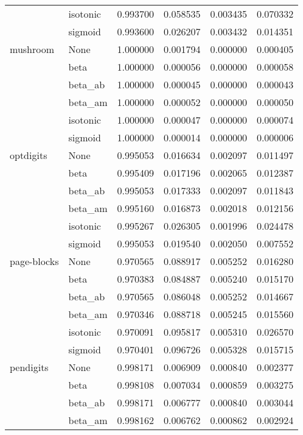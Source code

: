 \begin{tabular}{llrrrr}
        & isotonic &  0.993700 &  0.058535 &  0.003435 &  0.070332 \\
        & sigmoid &  0.993600 &  0.026207 &  0.003432 &  0.014351 \\
mushroom & None &  1.000000 &  0.001794 &  0.000000 &  0.000405 \\
        & beta &  1.000000 &  0.000056 &  0.000000 &  0.000058 \\
        & beta\_ab &  1.000000 &  0.000045 &  0.000000 &  0.000043 \\
        & beta\_am &  1.000000 &  0.000052 &  0.000000 &  0.000050 \\
        & isotonic &  1.000000 &  0.000047 &  0.000000 &  0.000074 \\
        & sigmoid &  1.000000 &  0.000014 &  0.000000 &  0.000006 \\
optdigits & None &  0.995053 &  0.016634 &  0.002097 &  0.011497 \\
        & beta &  0.995409 &  0.017196 &  0.002065 &  0.012387 \\
        & beta\_ab &  0.995053 &  0.017333 &  0.002097 &  0.011843 \\
        & beta\_am &  0.995160 &  0.016873 &  0.002018 &  0.012156 \\
        & isotonic &  0.995267 &  0.026305 &  0.001996 &  0.024478 \\
        & sigmoid &  0.995053 &  0.019540 &  0.002050 &  0.007552 \\
page-blocks & None &  0.970565 &  0.088917 &  0.005252 &  0.016280 \\
        & beta &  0.970383 &  0.084887 &  0.005240 &  0.015170 \\
        & beta\_ab &  0.970565 &  0.086048 &  0.005252 &  0.014667 \\
        & beta\_am &  0.970346 &  0.088718 &  0.005245 &  0.015560 \\
        & isotonic &  0.970091 &  0.095817 &  0.005310 &  0.026570 \\
        & sigmoid &  0.970401 &  0.096726 &  0.005328 &  0.015715 \\
pendigits & None &  0.998171 &  0.006909 &  0.000840 &  0.002377 \\
        & beta &  0.998108 &  0.007034 &  0.000859 &  0.003275 \\
        & beta\_ab &  0.998171 &  0.006777 &  0.000840 &  0.003044 \\
        & beta\_am &  0.998162 &  0.006762 &  0.000862 &  0.002924 \\

\end{tabular}
